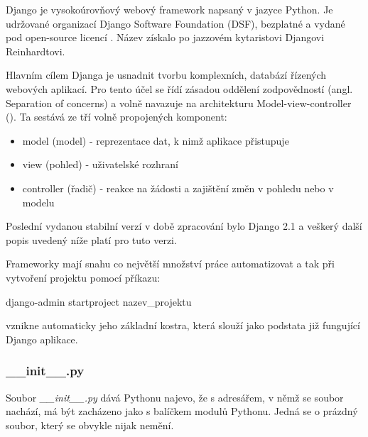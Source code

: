 
Django je vysokoúrovňový webový framework napsaný v jazyce Python. Je
udržované organizací Django Software Foundation (DSF), bezplatné a
vydané pod open-source licencí . Název získalo po jazzovém
kytaristovi Djangovi Reinhardtovi.

Hlavním cílem Djanga je usnadnit tvorbu komplexních, databází řízených
webových aplikací. Pro tento účel se řídí zásadou oddělení
zodpovědností (angl. Separation of concerns) a volně navazuje na
architekturu Model-view-controller (). Ta sestává ze tří volně
propojených komponent:
\begin{itemize}
\item model (model) - reprezentace dat, k nimž aplikace přistupuje
\item view (pohled) - uživatelské rozhraní
\item controller (řadič) - reakce na žádosti a zajištění změn v pohledu nebo v modelu
\end{itemize}

Poslední vydanou stabilní verzí v době zpracování bylo Django 2.1 a
veškerý další popis uvedený níže platí pro tuto verzi.

Frameworky mají snahu co největší množství práce automatizovat a tak
při vytvoření projektu pomocí příkazu:

\begin{center}
\textsf{django-admin startproject nazev\_projektu}
\end{center}

vznikne automaticky jeho základní kostra, která slouží jako podstata
již fungující Django aplikace.


\subsubsection{\_\_init\_\_.py}
Soubor \textit{\_\_init\_\_.py} dává Pythonu najevo, že s adresářem, v
němž se soubor nachází, má být zacházeno jako s balíčkem modulů
Pythonu. Jedná se o prázdný soubor, který se obvykle nijak nemění.


